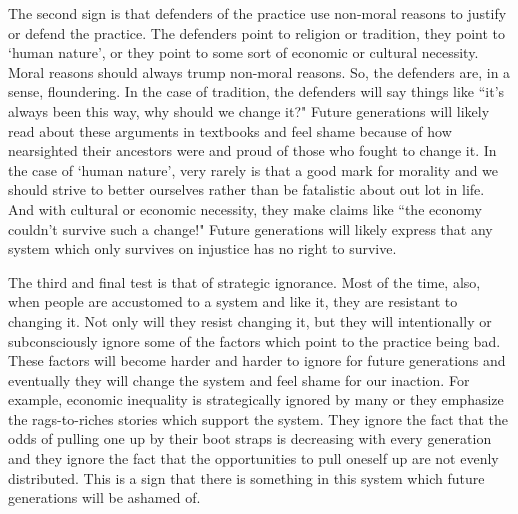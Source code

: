 The second sign is that defenders of the practice use non-moral reasons to justify or defend the practice. The defenders point to religion or tradition, they point to `human nature', or they point to some sort of economic or cultural necessity. Moral reasons should always trump non-moral reasons. So, the defenders are, in a sense, floundering. In the case of tradition, the defenders will say things like ``it's always been this way, why should we change it?" Future generations will likely read about these arguments in textbooks and feel shame because of how nearsighted their ancestors were and proud of those who fought to change it. In the case of  `human nature', very rarely is that a good mark for morality and we should strive to better ourselves rather than be fatalistic about out lot in life. And with cultural or economic necessity, they make claims like ``the economy couldn't survive such a change!" Future generations will likely express that any system which only survives on injustice has no right to survive. 

The third and final test is that of strategic ignorance. Most of the time, also, when people are accustomed to a system and like it, they are resistant to changing it. Not only will they resist changing it, but they will intentionally or subconsciously ignore some of the factors which point to the practice being bad. These factors will become harder and harder to ignore for future generations and eventually they will change the system and feel shame for our inaction. For example, economic inequality is strategically ignored by many or they emphasize the rags-to-riches stories which support the system. They ignore the fact that the odds of pulling one up by their boot straps is decreasing with every generation and they ignore the fact that the opportunities to pull oneself up are not evenly distributed. This is a sign that there is something in this system which future generations will be ashamed of.